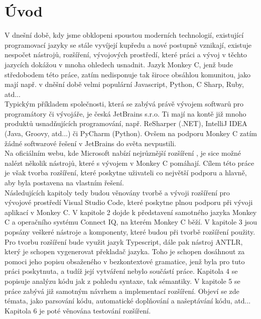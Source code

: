 \chapter{Úvod}
\label{sec:Introduction}
V dnešní době, kdy jsme obklopeni spoustou moderních technologií, existující programovací jazyky se stále vyvíjejí kupředu a nové postupně vznikají, existuje nespočet nástrojů, rozšíření, vývojových prostředí, které práci a vývoj v těchto jazycích dokážou v mnoha ohledech usnadnit. Jazyk Monkey C, jenž bude středobodem této práce, zatím nedisponuje tak široce obsáhlou komunitou, jako mají např. v dněšní době velmi populární Javascript, Python, C Sharp, Ruby, atd...\\

Typickým příkladem společnosti, která se zabývá právě vývojem softwarů pro programátory či vývojáře, je česká JetBrains s.r.o. Ti mají na kontě již mnoho produktů usnadňujících programování, např. ReSharper (.NET), IntelliJ IDEA (Java, Groovy, atd...) či PyCharm (Python). Ovšem na podporu Monkey C zatím žádné softwarové řešení v JetBrains do světa nevpustili. \cite{jetbrains} \\

Na oficiálním webu, kde Microsoft nabízí nejrůznější rozšíření  \cite{marketplace}, je sice možné nalézt několik nástrojů, které s vývojem v Monkey C pomáhají. Cílem této práce je však tvorba rozšíření, které poskytne uživateli co největší podporu a hlavně, aby byla postavena na vlastním řešení.
\\
Následujících kapitoly tedy budou věnovány tvorbě a vývoji rozšíření pro vývojové prostředí Visual Studio Code, které poskytne plnou podporu při vývoji aplikací v Monkey C. V kapitole 2 dojde k představení samotného jazyka Monkey C a operačního systému Connect IQ, na kterém Monkey C běží. V kapitole 3 jsou popsány veškeré nástroje a komponenty, které budou při tvorbě rozšíření použity. Pro tvorbu rozšíření bude využit jazyk Typescript, dále pak nástroj ANTLR, který je schopen vygenerovat překladač jazyka. Toho je schopen dosáhnout za pomoci jeho popisu obsaženého v bezkontextové gramatice, jenž byla pro tuto práci poskytnuta, a tudíž její vytváření nebylo součástí práce. Kapitola 4 se popisuje analýzu kódu jak z pohledu syntaxe, tak sémantiky. V kapitole 5 se práce zabývá již samotným návrhem a implementací rozšíření. Objeví se zde témata, jako parsování kódu, automatické doplňování a našeptávání kódu, atd... Kapitola 6 je poté věnována testování rozšíření.
 
\endinput